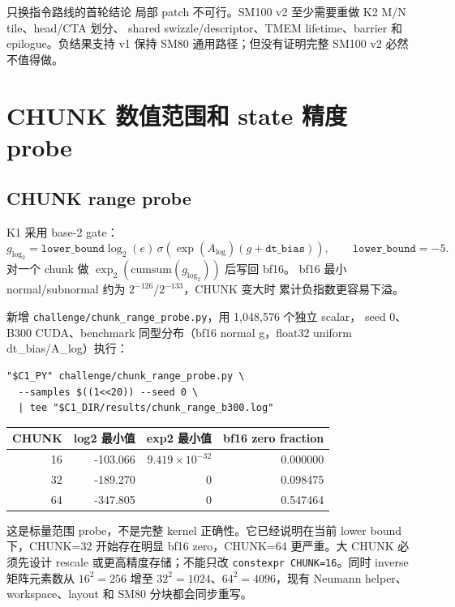 \documentclass[11pt,a4paper,fontset=none]{ctexart}
\newcommand{\code}[1]{\texttt{#1}}
\begin{document}
\begin{decision}{只换指令路线的首轮结论}
局部 patch 不可行。SM100 v2 至少需要重做 K2 M/N tile、head/CTA 划分、
shared swizzle/descriptor、TMEM lifetime、barrier 和 epilogue。负结果支持
v1 保持 SM80 通用路径；但没有证明完整 SM100 v2 必然不值得做。
\end{decision}

\section{CHUNK 数值范围和 state 精度 probe}

\subsection{CHUNK range probe}

K1 采用 base-2 gate：
\[
g_{\log_2}=\texttt{lower\_bound}\log_2(e)\,
\sigma(\exp(A_{\log})(g+\texttt{dt\_bias})),\qquad
\texttt{lower\_bound}=-5.
\]
对一个 chunk 做 \(\exp_2(\mathrm{cumsum}(g_{\log_2}))\) 后写回 bf16。
bf16 最小 normal/subnormal 约为 \(2^{-126}\)/\(2^{-133}\)，CHUNK 变大时
累计负指数更容易下溢。

新增 \code{challenge/chunk\_range\_probe.py}，用 1,048,576 个独立 scalar，
seed 0、B300 CUDA、benchmark 同型分布（bf16 normal g，float32 uniform
dt\_bias/A\_log）执行：

\begin{lstlisting}
"$C1_PY" challenge/chunk_range_probe.py \
  --samples $((1<<20)) --seed 0 \
  | tee "$C1_DIR/results/chunk_range_b300.log"
\end{lstlisting}

\begin{center}\small
\begin{tabular}{@{}rrrr@{}}
\toprule
CHUNK & log2 最小值 & exp2 最小值 & bf16 zero fraction \\
\midrule
16 & -103.066 & \(9.419\times10^{-32}\) & 0.000000 \\
32 & -189.270 & 0 & 0.098475 \\
64 & -347.805 & 0 & 0.547464 \\
\bottomrule
\end{tabular}
\end{center}

这是标量范围 probe，不是完整 kernel 正确性。它已经说明在当前 lower bound
下，CHUNK=32 开始存在明显 bf16 zero，CHUNK=64 更严重。大 CHUNK 必须先设计
rescale 或更高精度存储；不能只改 \code{constexpr CHUNK=16}。同时 inverse
矩阵元素数从 \(16^2=256\) 增至 \(32^2=1024\)、\(64^2=4096\)，现有
Neumann helper、workspace、layout 和 SM80 分块都会同步重写。
\end{document}
